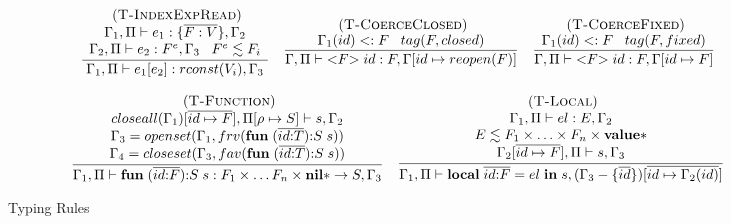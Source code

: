 \documentclass[preprint]{sigplanconf}
\newcommand{\Value}{\mathbf{value}}
\newcommand{\Nil}{\mathbf{nil}}
\newcommand{\Void}{\Nil{*}}
\newcommand{\mylabel}[1]{\; (\textsc{#1})}
\newcommand{\env}{\Gamma}
\newcommand{\penv}{\Pi}
\newcommand{\subtype}{<:}
\newcommand{\ret}{\rho}
\begin{document}
\begin{figure*}[t]
{\[\begin{array}{c}
\begin{array}{c}
\mylabel{T-IndexExpRead}\\
\dfrac{\begin{array}{c}
	\env_{1}, \penv \vdash e_{1}:\{\overline{F:V}\}, \env_{2}\\
	\env_{2}, \penv \vdash e_{2}:F^e, \env_{3} \;\;\;
	 F^e \lesssim F_{i}
	\end{array}}
{\env_{1}, \penv \vdash e_{1}[e_{2}]:rconst(V_{i}), \env_{3}}
\end{array}
\begin{array}{c}
\mylabel{T-CoerceClosed}\\
\dfrac{\env_{1}(id) \subtype F \;\;\; tag(F,closed)}
{\env, \penv \vdash {<}F{>} \; id:F, \env[id \mapsto reopen(F)]}
\end{array}
\begin{array}{c}
\mylabel{T-CoerceFixed}\\
\dfrac{\env_{1}(id) \subtype F \;\;\; tag(F,fixed)}
{\env, \penv \vdash {<}F{>} \; id:F, \env[id \mapsto F]}
\end{array}\\\\
\begin{array}{c}
\mylabel{T-Function}\\
\dfrac{\begin{array}{c}
	closeall(\env_{1})[\overline{id \mapsto F}], \penv[\ret \mapsto S] \vdash s, \env_{2}\\
	\env_{3} = openset(\env_{1}, frv(\mathbf{fun} \; (\overline{id{:}T}){:}S \; s)) \\
	\env_{4} = closeset(\env_{3}, fav(\mathbf{fun} \; (\overline{id{:}T}){:}S \; s))
	\end{array}}
{\env_{1}, \penv \vdash \mathbf{fun} \; (\overline{id{:}F}){:}S \; s:F_1 \times \ldots F_n \times \Void \rightarrow S, \env_{3}}
\end{array}
\begin{array}{c}
\mylabel{T-Local}\\
\dfrac{\begin{array}{c}
	\env_{1}, \penv \vdash el:E, \env_{2} \\
	E \lesssim F_1 \times \ldots \times F_n \times \Value{*} \\
	\env_{2}[\overline{id \mapsto F}], \penv \vdash s, \env_{3}
	\end{array}}
{\env_{1}, \penv \vdash \mathbf{local} \; \overline{id{:}F} = el \; \mathbf{in} \; s, (\env_{3} - \{\overline{id}\})[\overline{id \mapsto \env_2(id)}]}
\end{array}
\end{array}
\]
}
\caption{Typing Rules}
\label{fig:tablerules}
\end{figure*}
\end{document}
